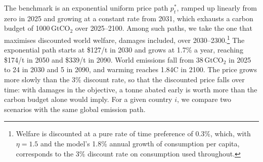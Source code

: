 \documentclass[12pt,english]{article}
\theoremstyle{remark}
\begin{document}
The benchmark is an exponential uniform price path $p^*_t$, ramped up linearly from zero in 2025 and growing at a constant rate from 2031, which exhausts a carbon budget of 1000\,GtCO$_2$ over 2025--2100. Among such paths, we take the one that maximises discounted world welfare, damages included, over 2030--2300.\footnote{Welfare is discounted at a pure rate of time preference of 0.3\%, which, with $\eta=1.5$ and the model's 1.8\% annual growth of consumption per capita, corresponds to the 3\% discount rate on consumption used throughout.} The exponential path starts at \$127/t in 2030 and grows at 1.7\% a year, reaching \$174/t in 2050 and \$339/t in 2090. World emissions fall from 38\,GtCO$_2$ in 2025 to 24 in 2030 and 5 in 2090, and warming reaches 1.84\textdegree C in 2100. %
The price grows more slowly than the 3\% discount rate, so that the discounted price falls over time: with damages in the objective, a tonne abated early is worth more than the carbon budget alone would imply. %
For a given country $i$, we compare two scenarios with the same global emission path.
\end{document}
